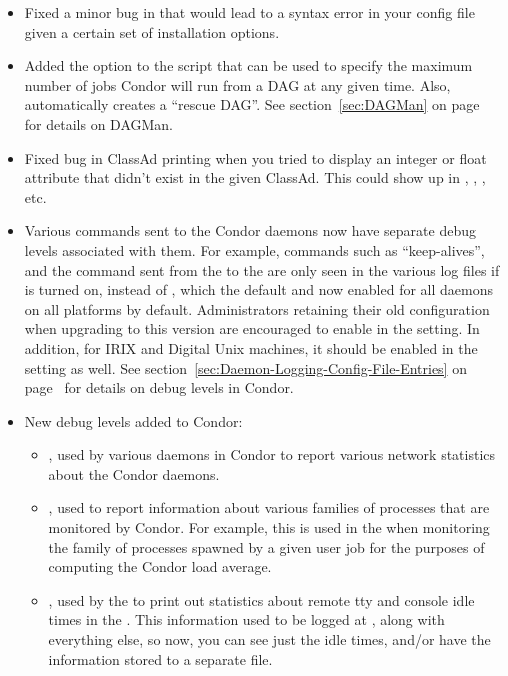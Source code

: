 \begin{itemize}
\item Fixed a minor bug in  that would lead to a
syntax error in your config file given a certain set of installation
options.  

\item Added the  option to the 
script that can be used to specify the maximum number of jobs Condor
will run from a DAG at any given time.
Also,  automatically creates a ``rescue DAG''.
See section~\ref{sec:DAGMan} on page~\pageref{sec:DAGMan} for details
on DAGMan.

\item Fixed bug in ClassAd printing when you tried to display an
integer or float attribute that didn't exist in the given ClassAd. 
This could show up in , , ,
etc. 

\item Various commands sent to the Condor daemons now have separate
debug levels associated with them.
For example, commands such as ``keep-alives'', and the command sent
from the  to the  are only seen in the
various log files if  is turned on, instead of
, which the default and now enabled for all daemons on
all platforms by default.
Administrators retaining their old configuration when upgrading to
this version are encouraged to enable  in the
 setting.  
In addition, for IRIX and Digital Unix machines, it should be enabled
in the  setting as well.
See section~\ref{sec:Daemon-Logging-Config-File-Entries} on
page~\pageref{sec:Daemon-Logging-Config-File-Entries} for details on
debug levels in Condor.

\item New debug levels added to Condor: 
\begin{itemize}
\item {}, used by various daemons in Condor to report
various network statistics about the Condor daemons. 
\item {}, used to report information about various
families of processes that are monitored by Condor.
For example, this is used in the  when monitoring the
family of processes spawned by a given user job for the purposes of
computing the Condor load average.
\item {}, used by the  to print out
statistics about remote tty and console idle times in the
.
This information used to be logged at , along with
everything else, so now, you can see just the idle times, and/or have
the information stored to a separate file.
\end{itemize}


\end{itemize}
